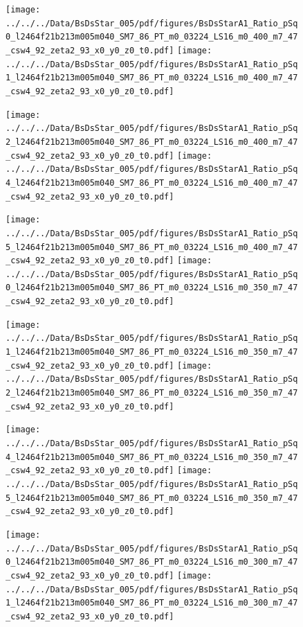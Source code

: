 \documentclass[a4paper,10pt]{article}
\begin{document}
\begin{figure}[p]
 \texttt{[image: ../../../Data/BsDsStar\_005/pdf/figures/BsDsStarA1\_Ratio\_pSq0\_l2464f21b213m005m040\_SM7\_86\_PT\_m0\_03224\_LS16\_m0\_400\_m7\_47\_csw4\_92\_zeta2\_93\_x0\_y0\_z0\_t0.pdf]} 
 \texttt{[image: ../../../Data/BsDsStar\_005/pdf/figures/BsDsStarA1\_Ratio\_pSq1\_l2464f21b213m005m040\_SM7\_86\_PT\_m0\_03224\_LS16\_m0\_400\_m7\_47\_csw4\_92\_zeta2\_93\_x0\_y0\_z0\_t0.pdf]} 
 \end{figure}
\begin{figure}[p]
 \texttt{[image: ../../../Data/BsDsStar\_005/pdf/figures/BsDsStarA1\_Ratio\_pSq2\_l2464f21b213m005m040\_SM7\_86\_PT\_m0\_03224\_LS16\_m0\_400\_m7\_47\_csw4\_92\_zeta2\_93\_x0\_y0\_z0\_t0.pdf]} 
 \texttt{[image: ../../../Data/BsDsStar\_005/pdf/figures/BsDsStarA1\_Ratio\_pSq4\_l2464f21b213m005m040\_SM7\_86\_PT\_m0\_03224\_LS16\_m0\_400\_m7\_47\_csw4\_92\_zeta2\_93\_x0\_y0\_z0\_t0.pdf]} 
 \end{figure}
\begin{figure}[p]
 \texttt{[image: ../../../Data/BsDsStar\_005/pdf/figures/BsDsStarA1\_Ratio\_pSq5\_l2464f21b213m005m040\_SM7\_86\_PT\_m0\_03224\_LS16\_m0\_400\_m7\_47\_csw4\_92\_zeta2\_93\_x0\_y0\_z0\_t0.pdf]} 
 \texttt{[image: ../../../Data/BsDsStar\_005/pdf/figures/BsDsStarA1\_Ratio\_pSq0\_l2464f21b213m005m040\_SM7\_86\_PT\_m0\_03224\_LS16\_m0\_350\_m7\_47\_csw4\_92\_zeta2\_93\_x0\_y0\_z0\_t0.pdf]} 
 \end{figure}
\clearpage
\begin{figure}[p]
 \texttt{[image: ../../../Data/BsDsStar\_005/pdf/figures/BsDsStarA1\_Ratio\_pSq1\_l2464f21b213m005m040\_SM7\_86\_PT\_m0\_03224\_LS16\_m0\_350\_m7\_47\_csw4\_92\_zeta2\_93\_x0\_y0\_z0\_t0.pdf]} 
 \texttt{[image: ../../../Data/BsDsStar\_005/pdf/figures/BsDsStarA1\_Ratio\_pSq2\_l2464f21b213m005m040\_SM7\_86\_PT\_m0\_03224\_LS16\_m0\_350\_m7\_47\_csw4\_92\_zeta2\_93\_x0\_y0\_z0\_t0.pdf]} 
 \end{figure}
\begin{figure}[p]
 \texttt{[image: ../../../Data/BsDsStar\_005/pdf/figures/BsDsStarA1\_Ratio\_pSq4\_l2464f21b213m005m040\_SM7\_86\_PT\_m0\_03224\_LS16\_m0\_350\_m7\_47\_csw4\_92\_zeta2\_93\_x0\_y0\_z0\_t0.pdf]} 
 \texttt{[image: ../../../Data/BsDsStar\_005/pdf/figures/BsDsStarA1\_Ratio\_pSq5\_l2464f21b213m005m040\_SM7\_86\_PT\_m0\_03224\_LS16\_m0\_350\_m7\_47\_csw4\_92\_zeta2\_93\_x0\_y0\_z0\_t0.pdf]} 
 \end{figure}
\begin{figure}[p]
 \texttt{[image: ../../../Data/BsDsStar\_005/pdf/figures/BsDsStarA1\_Ratio\_pSq0\_l2464f21b213m005m040\_SM7\_86\_PT\_m0\_03224\_LS16\_m0\_300\_m7\_47\_csw4\_92\_zeta2\_93\_x0\_y0\_z0\_t0.pdf]} 
 \texttt{[image: ../../../Data/BsDsStar\_005/pdf/figures/BsDsStarA1\_Ratio\_pSq1\_l2464f21b213m005m040\_SM7\_86\_PT\_m0\_03224\_LS16\_m0\_300\_m7\_47\_csw4\_92\_zeta2\_93\_x0\_y0\_z0\_t0.pdf]} 
 \end{figure}
\end{document}
